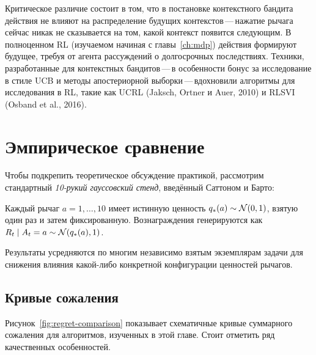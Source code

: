 Критическое различие состоит в том, что в постановке контекстного бандита действия не влияют на распределение будущих контекстов\,---\,нажатие рычага сейчас никак не сказывается на том, какой контекст появится следующим.  В полноценном RL (изучаемом начиная с главы~\ref{ch:mdp}) действия формируют будущее, требуя от агента рассуждений о долгосрочных последствиях.  Техники, разработанные для контекстных бандитов\,---\,в особенности бонус за исследование в стиле UCB и методы апостериорной выборки\,---\,вдохновили алгоритмы для исследования в RL, такие как UCRL (Jaksch, Ortner и Auer, 2010) и RLSVI (Osband et al., 2016).


\section{Эмпирическое сравнение}
\label{sec:bandit-experiments}

Чтобы подкрепить теоретическое обсуждение практикой, рассмотрим стандартный \emph{10-рукий гауссовский стенд}, введённый Саттоном и Барто:

\begin{example}
\label{ex:testbed}
Каждый рычаг $a=1,\dots,10$ имеет истинную ценность $q_*(a)\sim\mathcal{N}(0,1)$, взятую один раз и затем фиксированную.  Вознаграждения генерируются как $R_t\mid A_t=a \sim \mathcal{N}(q_*(a),1)$.
\end{example}

Результаты усредняются по многим независимо взятым экземплярам задачи для снижения влияния какой-либо конкретной конфигурации ценностей рычагов.

\subsection*{Кривые сожаления}

Рисунок~\ref{fig:regret-comparison} показывает схематичные кривые суммарного сожаления для алгоритмов, изученных в этой главе.  Стоит отметить ряд качественных особенностей.

